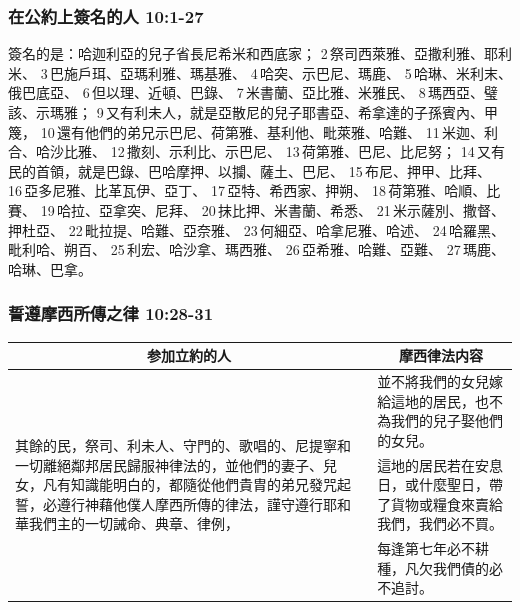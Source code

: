 \subsubsection{在公約上簽名的人 10:1-27}
簽名的是：哈迦利亞的兒子省長尼希米和西底家； 2 祭司西萊雅、亞撒利雅、耶利米、 3 巴施戶珥、亞瑪利雅、瑪基雅、 4 哈突、示巴尼、瑪鹿、 5 哈琳、米利末、俄巴底亞、 6 但以理、近頓、巴錄、 7 米書蘭、亞比雅、米雅民、 8 瑪西亞、璧該、示瑪雅； 9 又有利未人，就是亞散尼的兒子耶書亞、希拿達的子孫賓內、甲篾， 10 還有他們的弟兄示巴尼、荷第雅、基利他、毗萊雅、哈難、 11 米迦、利合、哈沙比雅、 12 撒刻、示利比、示巴尼、 13 荷第雅、巴尼、比尼努； 14 又有民的首領，就是巴錄、巴哈摩押、以攔、薩土、巴尼、 15 布尼、押甲、比拜、 16 亞多尼雅、比革瓦伊、亞丁、 17 亞特、希西家、押朔、 18 荷第雅、哈順、比賽、 19 哈拉、亞拿突、尼拜、 20 抹比押、米書蘭、希悉、 21 米示薩別、撒督、押杜亞、 22 毗拉提、哈難、亞奈雅、 23 何細亞、哈拿尼雅、哈述、 24 哈羅黑、毗利哈、朔百、 25 利宏、哈沙拿、瑪西雅、 26 亞希雅、哈難、亞難、 27 瑪鹿、哈琳、巴拿。

\subsubsection{誓遵摩西所傳之律 10:28-31}
\begin{table}[H]
\centering
\begin{tabular}{p{8.15cm}|p{}}\hline\hline
\multicolumn{1}{c|}{参加立約的人}&\multicolumn{1}{c}{摩西律法内容}\\\hline
\multirow{3}{8.25cm}{其餘的民，祭司、利未人、守門的、歌唱的、尼提寧和一切離絕鄰邦居民歸服神律法的，並他們的妻子、兒女，凡有知識能明白的，都隨從他們貴胄的弟兄發咒起誓，必遵行神藉他僕人摩西所傳的律法，謹守遵行耶和華我們主的一切誡命、典章、律例，}
&並不將我們的女兒嫁給這地的居民，也不為我們的兒子娶他們的女兒。\\\cline{2-2}
&這地的居民若在安息日，或什麼聖日，帶了貨物或糧食來賣給我們，我們必不買。\\\cline{2-2}
&每逢第七年必不耕種，凡欠我們債的必不追討。\\\hline
\end{tabular}
\end{table} 

